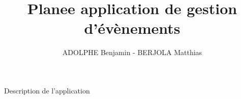 \documentclass[11pt]{beamer}
\author{ADOLPHE Benjamin - BERJOLA Matthias}
\begin{document}
\begin{frame}
\title{Planee application de gestion d'évènements}
\titlepage
\end{frame}

\begin{frame}
\tableofcontents
\end{frame}

\begin{frame}{Description de l'application}

\end{frame}
\end{document}

